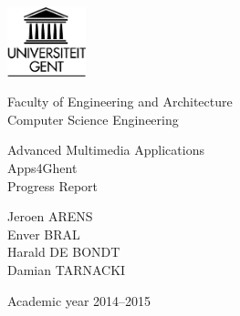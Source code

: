 

\begin{titlepage}

\setlength{\hoffset}{-1.3in}
\setlength{\voffset}{-1in}
\setlength{\topmargin}{1.5cm}
\setlength{\headheight}{0.5cm}
\setlength{\headsep}{1cm}
\setlength{\oddsidemargin}{3cm}
\setlength{\evensidemargin}{3cm}
\setlength{\footskip}{1.5cm}
\enlargethispage{1cm}

\fontsize{14pt}{16pt}
\selectfont

\begin{center}

\includegraphics[height=2cm]{fig/ruglogo}

\vspace{0.5cm}

Faculty of Engineering and Architecture\\
Computer Science Engineering\\

\vspace{3.5cm}

\fontsize{19.28pt}{23pt}
\selectfont

Advanced Multimedia Applications\\ 
Apps4Ghent\\
Progress Report

\fontsize{14pt}{16pt}
\selectfont

\vspace{2.2cm}

Jeroen ARENS\\
Enver BRAL\\
Harald DE BONDT\\
Damian TARNACKI


\vspace{6.4cm}

Academic year 2014--2015

\end{center}
\end{titlepage}